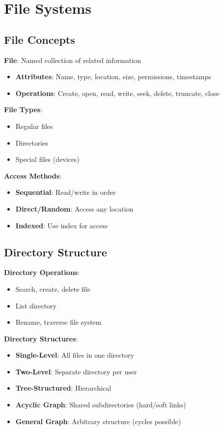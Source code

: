 \documentclass[12pt,a4paper]{report}
\begin{document}
\section{File Systems}

\subsection{File Concepts}
\begin{concept}
\textbf{File}: Named collection of related information
\begin{itemize}
    \item \textbf{Attributes}: Name, type, location, size, permissions, timestamps
    \item \textbf{Operations}: Create, open, read, write, seek, delete, truncate, close
\end{itemize}

\textbf{File Types}:
\begin{itemize}
    \item Regular files
    \item Directories
    \item Special files (devices)
\end{itemize}

\textbf{Access Methods}:
\begin{itemize}
    \item \textbf{Sequential}: Read/write in order
    \item \textbf{Direct/Random}: Access any location
    \item \textbf{Indexed}: Use index for access
\end{itemize}
\end{concept}

\subsection{Directory Structure}
\begin{concept}
\textbf{Directory Operations}:
\begin{itemize}
    \item Search, create, delete file
    \item List directory
    \item Rename, traverse file system
\end{itemize}

\textbf{Directory Structures}:
\begin{itemize}
    \item \textbf{Single-Level}: All files in one directory
    \item \textbf{Two-Level}: Separate directory per user
    \item \textbf{Tree-Structured}: Hierarchical
    \item \textbf{Acyclic Graph}: Shared subdirectories (hard/soft links)
    \item \textbf{General Graph}: Arbitrary structure (cycles possible)
\end{itemize}
\end{concept}
\end{document}
